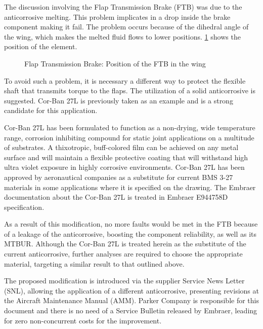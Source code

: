 The discussion involving the Flap Transmission Brake (FTB) was due to the anticorrosive melting. This problem implicates in a drop inside the brake component making it fail. The problem occurs because of the dihedral angle of the wing, which makes the melted fluid flows to lower positions. \ref{fig:FTB} shows the position of the element.

\begin{figure}[H] %
\caption{Flap Transmission Brake: Position of the FTB in the wing}
\label{fig:FTB}
\end{figure}

To avoid such a problem, it is necessary a different way to protect the flexible shaft that transmits torque to the flaps. The utilization of a solid anticorrosive is suggested. Cor-Ban 27L is previously taken as an example and is a strong candidate for this application.

Cor-Ban 27L has been formulated to function as a non-drying, wide temperature range, corrosion inhibiting compound for static joint applications on a multitude of substrates. A thixotropic, buff-colored film can be achieved on any metal surface and will maintain a flexible protective coating that will withstand high ultra violet exposure in highly corrosive environments. Cor-Ban 27L has been approved by aeronautical companies as a substitute for current BMS 3-27 materials in some applications where it is specified on the drawing.
The Embraer documentation about the Cor-Ban 27L is treated in Embraer E944758D specification.

As a result of this modification, no more faults would be met in the FTB because of a leakage of the anticorrosive, boosting the component reliability, as well as its MTBUR.
Although the Cor-Ban 27L is treated herein as the substitute of the current anticorrosive, further analyses are required to choose the appropriate material, targeting a similar result to that outlined above.

The proposed modification is introduced via the supplier Service News Letter (SNL), allowing the application of a different anticorrosive, presenting revisions at the Aircraft Maintenance Manual (AMM). Parker Company is responsible for this document and there is no need of a Service Bulletin released by Embraer, leading for zero non-concurrent costs for the improvement.
